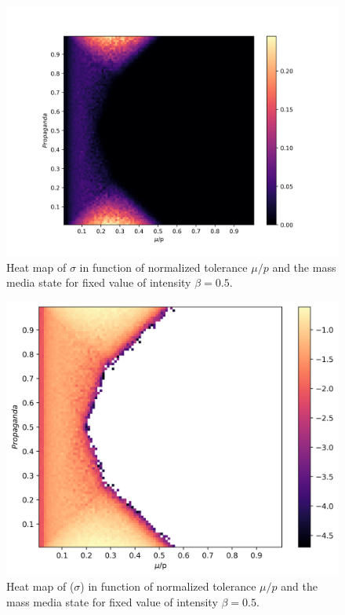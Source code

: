 \documentclass[%
 reprint,
 amsmath,amssymb,
 aps,
]{revtex4-2}
\begin{document}
\begin{figure}
    \centering
    \includegraphics[scale = 0.45]{images/global_prop_vs_mu_n1000_p100_i050.png}
    \caption{Heat map of $\sigma$ in function of normalized tolerance $\mu/p$ and the mass media state for fixed value of intensity $\beta = 0.5$.}
    \label{fig:sigma_prop_vs_tolerance_i05}
\end{figure}

\begin{figure}
    \centering
    \includegraphics[scale = 0.45]{images/log_sigma_prop_vs_mu_b05.png}
    \caption{Heat map of \log($\sigma$) in function of normalized tolerance $\mu/p$ and the mass media state for fixed value of intensity $\beta = 0.5$.}
    \label{fig:logsigma_prop_vs_tolerance_i05}
\end{figure}
\end{document}
